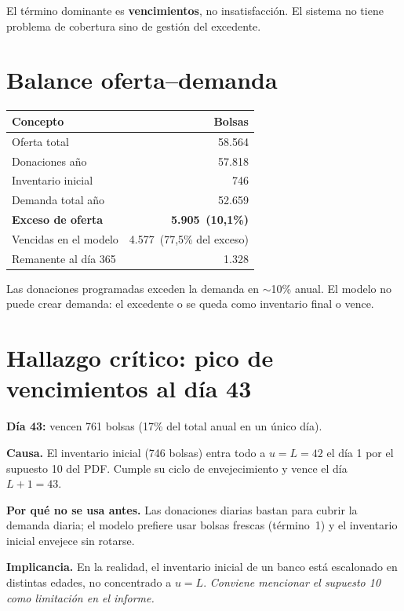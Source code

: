 \documentclass[11pt, a4paper]{article}
\begin{document}
El término dominante es \textbf{vencimientos}, no insatisfacción. El sistema no tiene problema de cobertura sino de gestión del excedente.

\section{Balance oferta--demanda}

\begin{center}
\begin{tabular}{lr}
\toprule
\rowcolor{rowgray}\textbf{Concepto} & \textbf{Bolsas}\\
\midrule
Oferta total & 58.564 \\
\quad Donaciones año & 57.818 \\
\quad Inventario inicial & 746 \\
Demanda total año & 52.659 \\
\midrule
\textbf{Exceso de oferta} & \textbf{5.905 \,(10,1\%)} \\
\quad Vencidas en el modelo & 4.577 \,(77,5\% del exceso) \\
\quad Remanente al día 365 & 1.328 \\
\bottomrule
\end{tabular}
\end{center}

Las donaciones programadas exceden la demanda en $\sim$10\% anual. El modelo no puede crear demanda: el excedente o se queda como inventario final o vence.

\section{Hallazgo crítico: pico de vencimientos al día 43}

\begin{nota}
\textbf{Día 43:} vencen 761 bolsas (17\% del total anual en un único día).
\end{nota}

\textbf{Causa.} El inventario inicial (746 bolsas) entra todo a $u = L = 42$ el día 1 por el supuesto 10 del PDF. Cumple su ciclo de envejecimiento y vence el día $L+1 = 43$.

\textbf{Por qué no se usa antes.} Las donaciones diarias bastan para cubrir la demanda diaria; el modelo prefiere usar bolsas frescas (término~1) y el inventario inicial envejece sin rotarse.

\textbf{Implicancia.} En la realidad, el inventario inicial de un banco está escalonado en distintas edades, no concentrado a $u=L$. \textit{Conviene mencionar el supuesto 10 como limitación en el informe.}
\end{document}
